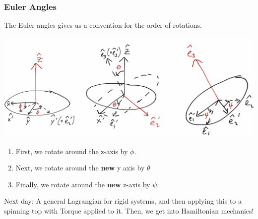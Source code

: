 \documentclass[../PHYS306Notes.tex]{subfiles}
\begin{document}
\subsubsection{Euler Angles}
The Euler angles gives us a convention for the order of rotations.
\begin{center}
    \includegraphics[scale=0.5]{Lecture-20/l20-img8.png}
\end{center}
\begin{enumerate}[1.]
\item First, we rotate around the z-axis by $\phi$.
\item Next, we rotate around the \textbf{new} y axis by $\theta$
\item Finally, we rotate around the \textbf{new} z-axis by $\psi$.
\end{enumerate}
Next day: A general Lagrangian for rigid systems, and then applying this to a spinning top with Torque applied to it. Then, we get into Hamiltonian mechanics!
\end{document}
